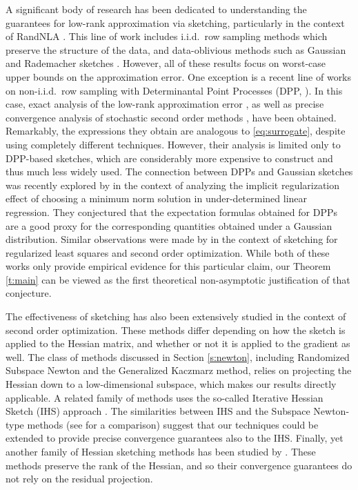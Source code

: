 \documentclass[../../thesis.tex]{subfiles}
\begin{document}
A significant body of research has been dedicated to understanding the
guarantees for low-rank approximation via sketching,
particularly in the context of
RandNLA \citep{DM16_CACM,RandNLA_PCMIchapter_chapter}. This line of work includes
i.i.d.~row sampling methods \citep{BoutsidisMD08,ridge-leverage-scores} which
preserve the structure of the data, and data-oblivious methods such as
Gaussian and Rademacher sketches \citep{Mah-mat-rev_JRNL,tropp2011structure,woodruff2014sketching}. However,
all of these results focus on worst-case
upper bounds on the approximation error. One exception is a recent
line of works on non-i.i.d.~row sampling with Determinantal Point Processes
(DPP, \citep{dpps-in-randnla}). In this case, exact analysis of the low-rank approximation
error \citep{nystrom-multiple-descent}, as well as precise convergence analysis
of stochastic second order methods \citep{randomized-newton}, have been
obtained. Remarkably, the expressions they obtain are analogous to
\eqref{eq:surrogate}, despite using completely different techniques. However, their analysis
is limited only to DPP-based sketches, which are considerably more
expensive to construct and thus much less widely used. The connection
between DPPs and Gaussian sketches was recently explored by
\citep{surrogate-design} in the context of analyzing the implicit
regularization effect of choosing a minimum norm solution in
under-determined linear regression. They conjectured that the
expectation formulas obtained for DPPs are a good proxy for the
corresponding quantities obtained under a Gaussian
distribution. Similar observations were made by
\citep{debiasing-second-order} in the context of sketching for
regularized least squares and second order optimization. While
both of these works only provide empirical evidence for this
particular claim, our Theorem \ref{t:main} can be
viewed as the first theoretical non-asymptotic justification of that
conjecture.

The effectiveness of sketching has also been extensively studied in
the context of second order optimization. These methods differ
depending on how the sketch is applied to the Hessian matrix, and
whether or not it is applied to the gradient as well. The class of
methods discussed in Section \ref{s:newton}, including Randomized
Subspace Newton and the Generalized Kaczmarz method, relies on
projecting the Hessian down to a low-dimensional subspace, which makes our
results directly applicable. A related family of methods uses
the so-called Iterative Hessian Sketch (IHS) approach \citep{pilanci2016iterative,lacotte2019faster}. The
similarities between IHS and the Subspace Newton-type methods (see
\citep{Qu2015Feb} for a comparison) suggest that our techniques could be
extended to provide precise convergence guarantees also to the IHS.
Finally, yet another family of Hessian sketching methods has been studied by
\citep{roosta2019sub,sketched-ridge-regression,XRM17_theory_TR,YXRM18_TR,fred_newtonMR_TR,distributed-newton,determinantal-averaging}.
These methods  preserve the  rank of the
Hessian, and so their convergence
guarantees do not rely on the residual projection.
\end{document}
